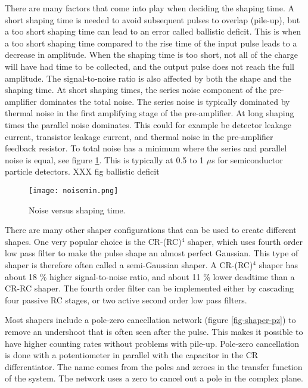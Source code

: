 \documentclass[../main/thesis.tex]{subfiles}
\begin{document}
There are many factors that come into play when deciding the shaping time. A short shaping time is needed to avoid subsequent pulses to overlap (pile-up), but a too short shaping time can lead to an error called ballistic deficit. This is when a too short shaping time compared to the rise time of the input pulse leads to a decrease in amplitude. When the shaping time is too short, not all of the charge will have had time to be collected, and the output pulse does not reach the full amplitude. The signal-to-noise ratio is also affected by both the shape and the shaping time. At short shaping times, the series noise component of the pre-amplifier dominates the total noise. The series noise is typically dominated by thermal noise in the first amplifying stage of the pre-amplifier. At long shaping times the parallel noise dominates. This could for example be detector leakage current, transistor leakage current, and thermal noise in the pre-amplifier feedback resistor. To total noise has a minimum where the series and parallel noise is equal, see figure \ref{fig-noise-min}. This is typically at 0.5 to 1 $\mu$s for semiconductor particle detectors. \citep{ORTEC}
XXX fig ballistic deficit
\begin{figure}%
	\centering
	\texttt{[image: noisemin.png]}
	\caption{Noise versus shaping time. \citep{ORTEC} }
	\label{fig-noise-min}
\end{figure}

There are many other shaper configurations that can be used to create different shapes. One very popular choice is the CR-(RC)$^4$ shaper, which uses fourth order low pass filter to make the pulse shape an almost perfect Gaussian. This type of shaper is therefore often called a semi-Gaussian shaper. A CR-(RC)$^4$ shaper has about 18 \% higher signal-to-noise ratio, and about 11 \% lower deadtime than a CR-RC shaper. The fourth order filter can be implemented either by cascading four passive RC stages, or two active second order low pass filters. \citep{ORTEC} \citep[chap. 17]{Knoll}

Most shapers include a pole-zero cancellation network (figure \ref{fig-shaper-pz}) to remove an undershoot that is often seen after the pulse. This makes it possible to have higher counting rates without problems with pile-up. Pole-zero cancellation is done with a potentiometer in parallel with the capacitor in the CR differentiator. The name comes from the poles and zeroes in the transfer function of the system. The network uses a zero to cancel out a pole in the complex plane. \citep{ORTEC}
\end{document}
